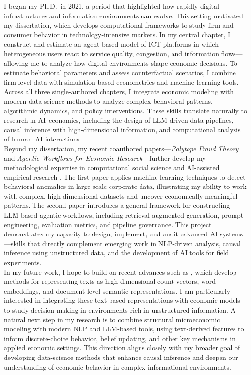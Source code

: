 \documentclass{nfr}
\begin{document}
I began my Ph.D.\ in 2021, a period that highlighted how rapidly digital infrastructures and information environments can evolve. 
This setting motivated my dissertation, which develops computational frameworks to study firm and consumer behavior in technology‐intensive markets. 
In my central chapter, I construct and estimate an agent‐based model of ICT platforms in which heterogeneous users react to service quality, congestion, and information flows—allowing me to analyze how digital environments shape economic decisions. 
To estimate behavioral parameters and assess counterfactual scenarios, I combine firm‐level data with simulation‐based econometrics and machine‐learning tools. 
Across all three single-authored chapters, I integrate economic modeling with modern data-science methods to analyze complex behavioral patterns, algorithmic dynamics, and policy interventions. 
These skills translate naturally to research in AI–economics, including the design of LLM-driven data pipelines, causal inference with high-dimensional information, and computational analysis of human–AI interactions.\\

Beyond my dissertation, my recent coauthored papers—\textit{Polytope Fraud Theory} and \textit{Agentic Workflows for Economic Research}—further develop my methodological expertise in computational social science and AI-assisted empirical research \citep{Zhao2025, Dawid2025}. 
The first paper applies machine-learning techniques to detect behavioral anomalies in large-scale corporate data, illustrating my ability to work with complex, high-dimensional datasets and uncover economically meaningful patterns. 
The second paper introduces a general framework for constructing LLM-based agentic workflows, including retrieval-augmented generation, prompt engineering, evaluation metrics, and pipeline governance. 
This project demonstrates my capacity to design, implement, and audit advanced AI systems—skills that directly complement emerging work in NLP-driven analysis, causal inference using unstructured data, and the development of AI tools for field experiments.\\

In my future work, I hope to build on recent advances such as \citet{ash2023text}, which develop methods for representing texts as high-dimensional count vectors, word embeddings, and document-level semantic representations. 
I am particularly interested in integrating these text-based representations with economic models to study decision-making in environments rich in unstructured information. 
A natural next step in my research is to combine structural microeconomic modeling with modern NLP and LLM-based tools, using text-derived features to inform discrete-choice behavior, belief updating, and other key mechanisms in applied economic settings. 
This direction aligns closely with my broader goal of developing data-science methods that enhance causal inference and deepen our understanding of economic behavior in complex informational environments.\\
\end{document}
